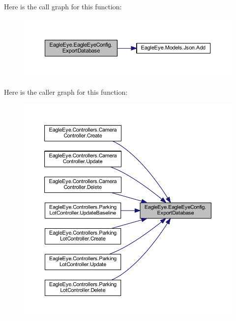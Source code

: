 Here is the call graph for this function\+:\nopagebreak
\begin{figure}[H]
\begin{center}
\leavevmode
\includegraphics[width=350pt]{class_eagle_eye_1_1_eagle_eye_config_ae238a449c2d6a52f9825fb75096e2299_cgraph}
\end{center}
\end{figure}
Here is the caller graph for this function\+:\nopagebreak
\begin{figure}[H]
\begin{center}
\leavevmode
\includegraphics[width=350pt]{class_eagle_eye_1_1_eagle_eye_config_ae238a449c2d6a52f9825fb75096e2299_icgraph}
\end{center}
\end{figure}
\mbox{\label{class_eagle_eye_1_1_eagle_eye_config_a321d469bb1a71e255f2318ad1ec30058}} 
